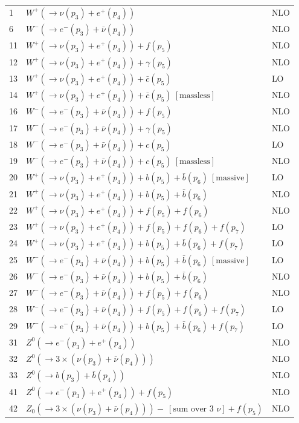 \documentclass[12pt]{article}
\begin{document}
\begin{itemize}
\begin{table}
\begin{center}
\begin{tabular}{|l|l|l|}
1 & $ W^+(\to \nu(p_3)+e^+(p_4)) $ & NLO \\
6 & $ W^-(\to e^-(p_3)+\bar{\nu}(p_4)) $ & NLO \\
\hline 
11& $ W^+(\to \nu(p_3)+e^+(p_4))+f(p_5) $ & NLO \\
12& $ W^+(\to \nu(p_3)+e^+(p_4))+\gamma(p_5) $ & NLO \\
13& $ W^+(\to \nu(p_3)+e^+(p_4))+\bar{c}(p_5) $ & LO \\
14& $ W^+(\to \nu(p_3)+e^+(p_4))+\bar{c}(p_5) ~[ \mbox{massless} ] $ & NLO \\
16& $ W^-(\to e^-(p_3)+\bar{\nu}(p_4))+f(p_5) $ & NLO \\
17& $ W^-(\to e^-(p_3)+\bar{\nu}(p_4))+\gamma(p_5) $ & NLO \\
18& $ W^-(\to e^-(p_3)+\bar{\nu}(p_4))+c(p_5) $ & LO \\
19& $ W^-(\to e^-(p_3)+\bar{\nu}(p_4))+c(p_5) ~[ \mbox{massless} ] $ & NLO \\
\hline 
20& $ W^+(\to \nu(p_3)+e^+(p_4)) +b(p_5)+\bar{b}(p_6) ~[ \mbox{massive} ] $ & LO \\
21& $ W^+(\to \nu(p_3)+e^+(p_4)) +b(p_5)+\bar{b}(p_6) $ & NLO \\
22& $ W^+(\to \nu(p_3)+e^+(p_4)) +f(p_5)+f(p_6) $ & NLO \\
23& $ W^+(\to \nu(p_3)+e^+(p_4)) +f(p_5)+f(p_6)+f(p_7) $ & LO \\
24& $ W^+(\to \nu(p_3)+e^+(p_4)) +b(p_5)+\bar{b}(p_6)+f(p_7) $ & LO \\
25& $ W^-(\to e^-(p_3)+\bar{\nu}(p_4)) +b(p_5)+\bar{b}(p_6) ~[ \mbox{massive} ] $ & LO \\
26& $ W^-(\to e^-(p_3)+\bar{\nu}(p_4)) +b(p_5)+\bar{b}(p_6) $ & NLO \\
27& $ W^-(\to e^-(p_3)+\bar{\nu}(p_4)) +f(p_5)+f(p_6) $ & NLO \\
28& $ W^-(\to e^-(p_3)+\bar{\nu}(p_4)) +f(p_5)+f(p_6)+f(p_7) $ & LO \\
29& $ W^-(\to e^-(p_3)+\bar{\nu}(p_4)) +b(p_5)+\bar{b}(p_6)+f(p_7) $ & LO \\
\hline 
31& $ Z^0(\to e^-(p_3)+e^+(p_4)) $ & NLO \\
32& $ Z^0(\to 3\times(\nu(p_3)+\bar{\nu}(p_4))) $ & NLO \\
33& $ Z^0(\to b(p_3)+\bar{b}(p_4)) $ & NLO \\
\hline 
41& $ Z^0(\to e^-(p_3)+e^+(p_4))+f(p_5) $ & NLO \\
42& $ Z_0(\to 3\times(\nu(p_3)+\bar{\nu}(p_4)))-~[ \mbox{sum over 3 $\nu$} ]+f(p_5) $ & NLO \\

\end{tabular}
\end{center}
\end{table}
\end{itemize}
\end{document}
